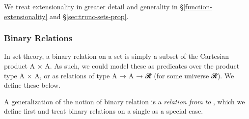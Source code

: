 \ccpad
We treat extensionality in greater detail and generality in \S\ref{function-extensionality} and \S\ref{sec:trunc-sets-prop}.










\subsubsection{Binary Relations}\label{sec:binary-relations}

In set theory, a binary relation on a set  is simply a subset of the Cartesian product \ab A × \ab A. As such, we could model these as predicates over the product type \ab A \af × \ab A, or as relations of type
\ab A \as → \ab A \as → \ab 𝓡\af ̇  (for some universe \ab 𝓡). We define these below.

A generalization of the notion of binary relation is a \emph{relation from}  \emph{to} , which we define first and treat binary relations on a single  as a special case.
\ccpad
\begin{code}
\>[1]\AgdaSpace{}%
\AgdaSymbol{:}\AgdaSpace{}%
%
\AgdaSpace{}%
\AgdaSpace{}%
%
\AgdaSpace{}%
\AgdaSpace{}%
\AgdaSymbol{(}\AgdaSpace{}%
\AgdaSymbol{:}\AgdaSpace{}%
\AgdaSymbol{)}\AgdaSpace{}%
\AgdaSpace{}%
\AgdaSymbol{(}\AgdaSpace{}%
\AgdaSpace{}%
\AgdaSpace{}%
\AgdaSpace{}%
\AgdaSpace{}%
\AgdaSymbol{)}%
\<%
\\
%
\>[1]\AgdaSpace{}%
\AgdaSpace{}%
\AgdaSpace{}%
\AgdaSpace{}%
\AgdaSymbol{=}\AgdaSpace{}%
\AgdaSpace{}%
\AgdaSpace{}%
\AgdaSpace{}%
\AgdaSpace{}%
%
\<%
\\
%
\\[\AgdaEmptyExtraSkip]%
%
\>[1]\AgdaSpace{}%
\AgdaSymbol{:}\AgdaSpace{}%
%
\AgdaSpace{}%
\AgdaSpace{}%
\AgdaSymbol{(}\AgdaSpace{}%
\AgdaSymbol{:}\AgdaSpace{}%
\AgdaSymbol{)}\AgdaSpace{}%
\AgdaSpace{}%
\AgdaSpace{}%
\AgdaSpace{}%
\AgdaSpace{}%
%
\<%
\\
%
\>[1]\AgdaSpace{}%
\AgdaSpace{}%
\AgdaSpace{}%
\AgdaSymbol{=}\AgdaSpace{}%
\AgdaSpace{}%
\AgdaSpace{}%
\AgdaSpace{}%
\<%
\end{code}
\scpad

